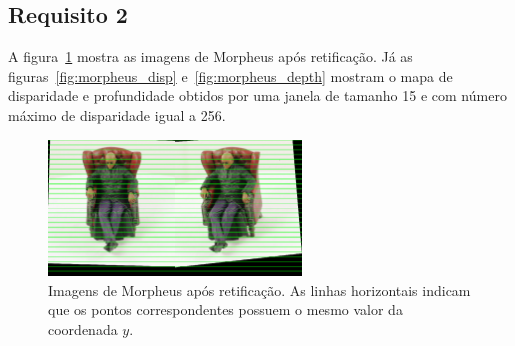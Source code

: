 \documentclass{bmvc2k}
\begin{document}
\subsection{Requisito 2}
A figura~\ref{fig:rec} mostra as imagens de Morpheus após retificação. Já as figuras~\ref{fig:morpheus_disp} e~\ref{fig:morpheus_depth} mostram o mapa de disparidade e profundidade obtidos por uma janela de tamanho 15 e com número máximo de disparidade igual a 256.

\begin{figure}[htb] 
\centering
\includegraphics[width=0.6\textwidth]{figs/rec.png}
\caption{Imagens de Morpheus após retificação. As linhas horizontais indicam que os pontos correspondentes possuem o mesmo valor da coordenada $y$.\label{fig:rec}}
\end{figure}
\end{document}
